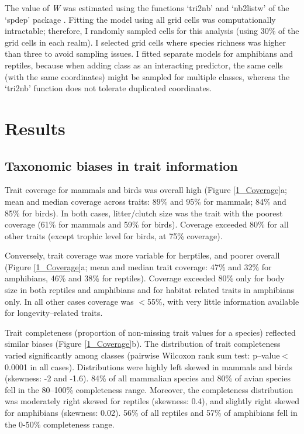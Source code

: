 The value of \textit{W} was estimated using the functions `tri2nb' and `nb2listw' of the `spdep' package \citep{spatialreg3, spdep1}. Fitting the model using all grid cells was computationally intractable; therefore, I randomly sampled cells for this analysis (using 30\% of the grid cells in each realm). I selected grid cells where species richness was higher than three to avoid sampling issues. I fitted separate models for amphibians and reptiles, because when adding class as an interacting predictor, the same cells (with the same coordinates) might be sampled for multiple classes, whereas the `tri2nb' function does not tolerate duplicated coordinates.

\section{Results}

\subsection{Taxonomic biases in trait information}
Trait coverage for mammals and birds was overall high (Figure \ref{1_Coverage}a; mean and median coverage across traits: 89\% and 95\% for mammals; 84\% and 85\% for birds). In both cases, litter/clutch size was the trait with the poorest coverage (61\% for mammals and 59\% for birds). Coverage exceeded 80\% for all other traits (except  trophic level for birds, at 75\% coverage).

Conversely, trait coverage was more variable for herptiles, and poorer overall (Figure \ref{1_Coverage}a; mean and median trait coverage: 47\% and 32\% for amphibians, 46\% and 38\% for reptiles). Coverage exceeded 80\% only for body size in both reptiles and amphibians and for habitat related traits in amphibians only. In all other cases coverage was  $<$55\%, with very little information available for longevity--related traits. 

Trait completeness (proportion of non-missing trait values for a species) reflected similar biases (Figure \ref{1_Coverage}b). The distribution of trait completeness varied significantly among classes (pairwise Wilcoxon rank sum test: p--value$<$0.0001 in all cases). Distributions were highly left skewed in mammals and birds (skewness: -2 and -1.6). 84\% of all mammalian species and 80\% of avian species fell in the 80--100\% completeness range. Moreover, the completeness distribution was moderately right skewed for reptiles (skewness: 0.4), and slightly right skewed for amphibians (skewness: 0.02). 56\% of all reptiles and 57\% of amphibians fell in the 0-50\% completeness range. 

